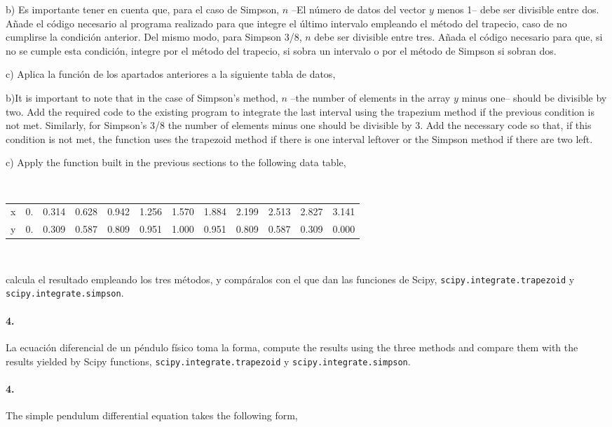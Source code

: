 \begin{paracol}{2}
 b) Es importante tener en cuenta que, para el caso de Simpson, $n$ --El número de datos del vector $y$ menos 1-- debe ser divisible entre dos. Añade el código necesario al programa realizado para que integre el último intervalo empleando el método del trapecio, caso de no cumplirse la condición anterior. Del mismo modo, para Simpson 3/8, $n$ debe ser divisible entre tres. Añada el código necesario para que, si no se cumple esta condición, integre por el método del trapecio, si sobra un intervalo o por el método de Simpson si sobran dos.

c) Aplica la función de los apartados anteriores a la siguiente tabla de datos,

\switchcolumn	
b)It is important to note that in the case of Simpson's method, $n$ --the number of elements in the array $y$ minus one-- should be divisible by two. Add the required code to the existing program to integrate the last interval using the trapezium method if the previous condition is not met. Similarly, for Simpson's 3/8 the number of elements minus one should be divisible by 3. Add the necessary code so that, if this condition is not met, the function uses the trapezoid method if there is one interval leftover or the Simpson method if there are two left.    

c) Apply the function built in the previous sections to the following data table,
\end{paracol}
\ \\
\begin{tabular}{r r r r r r r r r r r r}
\hline
x & 0. &0.314 & 	0.628 &	0.942 &	1.256 &	1.570 &	1.884 &	 2.199 &	2.513 &	 2.827 &	3.141\\
y & 0. &0.309 &	0.587 &	0.809 &	0.951 &	1.000 &	0.951 &    0.809 &	0.587 &	0.309 &	0.000\\
\hline
\end{tabular}
\ \\
\begin{paracol}{2}
\noindent calcula el resultado empleando los tres métodos, y compáralos con el que dan las funciones de Scipy,  \texttt{scipy.integrate.trapezoid} y \texttt{scipy.integrate.simpson}.

\paragraph{4.} La ecuación diferencial de un péndulo físico toma la forma,
\switchcolumn	
\noindent compute the results using the three methods and compare them with the results yielded by Scipy functions, \texttt{scipy.integrate.trapezoid} y \texttt{scipy.integrate.simpson}.

\paragraph{4.} The simple pendulum differential equation takes the following form, 
\end{paracol}

